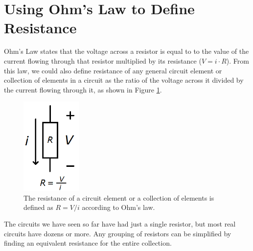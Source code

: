 \section{Using Ohm's Law to Define Resistance}
Ohm's Law states that the voltage across a resistor is equal to to the value of the current flowing through that resistor multiplied by its resistance ($V = i \cdot R$). From this law, we could also define resistance of any general circuit element or collection of elements in a circuit as the ratio of the voltage across it divided by the current flowing through it, as shown in Figure \ref{genericElementResistance}. 
\begin{figure}[h!]
\centering
\includegraphics[width=3cm]{figures/singleElementRes.png}
\caption{The resistance of a circuit element or a collection of elements is defined as $R = V/i$ according to Ohm's law.}
\label{genericElementResistance}
\end{figure}

The circuits we have seen so far have had just a single resistor, but most real circuits have dozens or more. Any grouping of resistors can be simplified by finding an equivalent resistance for the entire collection.


